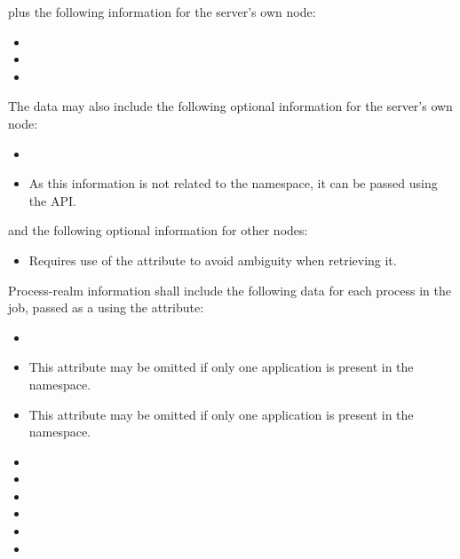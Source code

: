 plus the following information for the server's own node:

\begin{itemize}
    \item {}
    \item {}
    \item {}
\end{itemize}

The data may also include the following optional information for the server's own node:

\begin{itemize}
    \item {}
    \item {}As this information is not related to the namespace, it can be passed using the  \ac{API}.
    \pasteAttributeItemEnd
\end{itemize}

and the following optional information for other nodes:

\begin{itemize}
    \item {}Requires use of the  attribute to avoid ambiguity when retrieving it.
    \pasteAttributeItemEnd
\end{itemize}

Process-realm information shall include the following data for each process in the job, passed as a  using the  attribute:

\begin{itemize}
    \item {}
    \item {}This attribute may be omitted if only one application is present in the namespace.
    \pasteAttributeItemEnd
    \item {}This attribute may be omitted if only one application is present in the namespace.
    \pasteAttributeItemEnd
    \item {}
    \item {}
    \item {}
    \item {}
    \item {}
    \item {}
\end{itemize}

